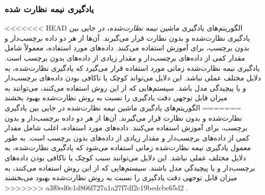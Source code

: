 
\subsubsection{یادگیری نیمه نظارت شده}

<<<<<<< HEAD
الگوریتم‌های یادگیری ماشین \textit{نیمه نظارت‌شده}، در جایی بین یادگیری نظارت‌شده و بدون نظارت قرار می‌گیرند. آن‌ها از هر دو داده برچسب‌دار و بدون برچسب، برای آموزش استفاده می‌کنند. داده‌های مورد استفاده، معمولاً شامل مقدار کمی از داده‌های برچسب‌دار و مقدار زیادی از داده‌های بدون برچسب است. یادگیری نیمه نظارت‌شده زمانی مورد استفاده قرار می‌گیرد که یادگیری نظارت‌شده، به دلایل مختلف عملی نباشد. این دلایل می‌تواند کوچک یا ناکافی بودن داده‌های برچسب‌دار و یا پیچیدگی مدل باشد. سیستم‌هایی که از این روش استفاده می‌کنند، می‌توانند به میزان قابل توجهی دقت یادگیری را نسبت به روش نظارت‌شده بهبود بخشند
=======
الگوریتم‌های یادگیری ماشین نیمه نظارت‌شده در جایی بین یادگیری نظارت‌شده و بدون نظارت قرار می‌گیرند. آن‌ها از هر دو داده برچسب‌دار و بدون برچسب، برای آموزش استفاده می‌کنند. داده‌های مورد استفاده، اغلب شامل مقدار کمی از داده‌های برچسب‌دار و مقدار زیادی از داده‌های بدون برچسب است. به طور معمول یادگیری نیمه نظارت‌شده زمانی استفاده می‌شود که یادگیری نظارت‌شده، به دلایل مختلف عملی نباشد. این دلایل می‌توانند سبب کوچک یا ناکافی بودن داده‌های برچسب‌دار و یا پیچیدگی مدل باشند. سیستم‌هایی که از این روش استفاده می‌کنند، به میزان قابل توجهی دقت یادگیری را نسبت به روش نظارت‌شده بهبود می‌بخشند
>>>>>>> a3f0ed0c1d866f727a1a27f7df2c19bedcbe65d2
\cite{mldef}. 
